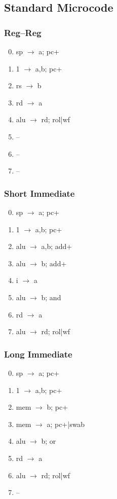 \documentclass[11pt]{book}
\begin{document}
\subsection*{Standard Microcode}
\begin{multicols}{3}\ttfamily\selectfont\small
  \subsubsection*{Reg--Reg}
  \begin{enumerate}\setcounter{enumi}{-1}
  \item sp \(\rightarrow\) a; pc+
  \item 1 \(\rightarrow\) a,b; pc+
  \item rs \(\rightarrow\) b
  \item rd \(\rightarrow\) a
  \item alu \(\rightarrow\) rd; rol|wf
  \item --
  \item --
  \item --
  \end{enumerate}
  \columnbreak
  \subsubsection*{Short Immediate}
  \begin{enumerate}\setcounter{enumi}{-1}
  \item sp \(\rightarrow\) a; pc+
  \item 1 \(\rightarrow\) a,b; pc+
  \item alu \(\rightarrow\) a,b; add+
  \item alu \(\rightarrow\) b; add+
  \item i \(\rightarrow\) a
  \item alu \(\rightarrow\) b; and
  \item rd \(\rightarrow\) a
  \item alu \(\rightarrow\) rd; rol|wf
  \end{enumerate}
  \columnbreak
  \subsubsection*{Long Immediate}
  \begin{enumerate}\setcounter{enumi}{-1}
  \item sp \(\rightarrow\) a; pc+
  \item 1 \(\rightarrow\) a,b; pc+
  \item mem \(\rightarrow\) b; pc+
  \item mem \(\rightarrow\) a; pc+|swab
  \item alu \(\rightarrow\) b; or
  \item rd \(\rightarrow\) a
  \item alu \(\rightarrow\) rd; rol|wf
  \item --
  \end{enumerate}
\end{multicols}
\end{document}

